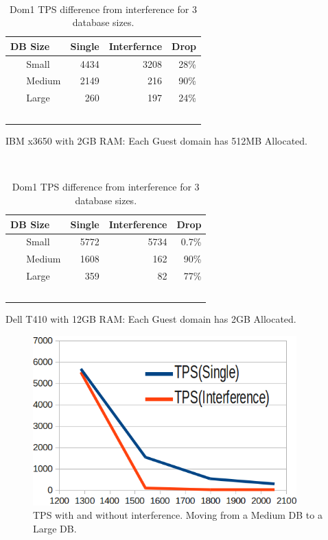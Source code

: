 \begin{table}[h]
\begingroup
    \fontsize{10pt}{12pt}\selectfont
\begin{subtable}[h]{0.45\textwidth}
  \begin{tabular}{ l | r | r | r }
    DB Size & Single & Interfernce & Drop \\
    \hline
    Small & 4434 & 3208 & 28\% \\ \hline
    Medium & 2149 & 216 & 90\% \\ \hline
    Large & 260 & 197 & 24\% \\  \hline
    \hline
  \end{tabular}
\caption{IBM x3650 with 2GB RAM:  Each Guest domain has 512MB Allocated.}
\end{subtable}
\hfill
\begin{subtable}[h]{0.45\textwidth}
  \begin{tabular}{ l | r | r | r }
    DB Size & Single & Interference & Drop \\
    \hline
    Small & 5772 & 5734 & 0.7\% \\ \hline
    Medium & 1608 & 162 & 90\% \\ \hline
    Large & 359 & 82 & 77\% \\  \hline
    \hline
  \end{tabular}
\caption{Dell T410 with 12GB RAM:  Each Guest domain has 2GB Allocated. }
\end{subtable}
\caption{Dom1 TPS difference from interference for 3 database sizes.}
\label{fig:tps1}
\endgroup
\end{table}

\begin{figure}[!h]
  \begin{center}
  \includegraphics[width=4in]{images/MedScale.png}
  \caption{TPS with and without interference.  Moving from a Medium DB to a Large DB.}
  \label{fig:medIO}
  \end{center}
\end{figure}

